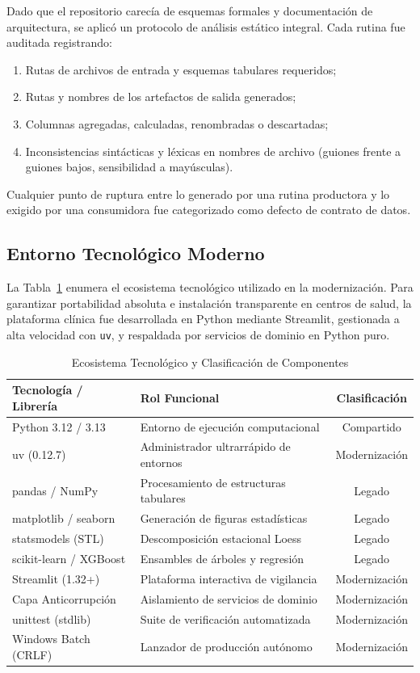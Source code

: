 \documentclass[conference]{IEEEtran}
\begin{document}
Dado que el repositorio carec\'ia de esquemas formales y documentaci\'on de arquitectura, se aplic\'o un protocolo de an\'alisis est\'atico integral. Cada rutina fue auditada registrando:
\begin{enumerate}
  \item Rutas de archivos de entrada y esquemas tabulares requeridos;
  \item Rutas y nombres de los artefactos de salida generados;
  \item Columnas agregadas, calculadas, renombradas o descartadas;
  \item Inconsistencias sint\'acticas y l\'exicas en nombres de archivo (guiones frente a guiones bajos, sensibilidad a may\'usculas).
\end{enumerate}
Cualquier punto de ruptura entre lo generado por una rutina productora y lo exigido por una consumidora fue categorizado como defecto de contrato de datos.

\subsection{Entorno Tecnol\'ogico Moderno}

La Tabla~\ref{tab:tools} enumera el ecosistema tecnol\'ogico utilizado en la modernizaci\'on. Para garantizar portabilidad absoluta e instalaci\'on transparente en centros de salud, la plataforma cl\'inica fue desarrollada en Python mediante Streamlit, gestionada a alta velocidad con \texttt{uv}, y respaldada por servicios de dominio en Python puro.

\begin{table}[!t]
\caption{Ecosistema Tecnol\'ogico y Clasificaci\'on de Componentes}
\label{tab:tools}
\centering
\footnotesize
\begin{tabular}{@{}llc@{}}
\toprule
\textbf{Tecnolog\'ia / Librer\'ia} & \textbf{Rol Funcional} & \textbf{Clasificaci\'on} \\
\midrule
Python 3.12 / 3.13 & Entorno de ejecuci\'on computacional & Compartido \\
uv (0.12.7) & Administrador ultrarr\'apido de entornos & Modernizaci\'on \\
pandas / NumPy & Procesamiento de estructuras tabulares & Legado \\
matplotlib / seaborn & Generaci\'on de figuras estad\'isticas & Legado \\
statsmodels (STL) & Descomposici\'on estacional Loess & Legado \\
scikit-learn / XGBoost & Ensambles de \'arboles y regresi\'on & Legado \\
Streamlit (1.32+) & Plataforma interactiva de vigilancia & Modernizaci\'on \\
Capa Anticorrupci\'on & Aislamiento de servicios de dominio & Modernizaci\'on \\
unittest (stdlib) & Suite de verificaci\'on automatizada & Modernizaci\'on \\
Windows Batch (CRLF) & Lanzador de producci\'on aut\'onomo & Modernizaci\'on \\
\bottomrule
\end{tabular}
\end{table}
\end{document}
